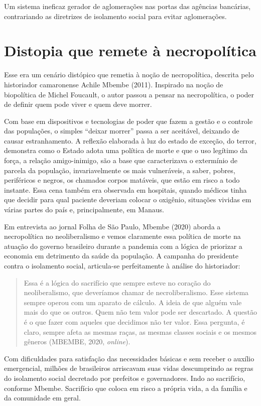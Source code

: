 Um sistema ineficaz gerador de aglomerações nas portas das agências
bancárias, contrariando as diretrizes de isolamento social para evitar
aglomerações.

\section{Distopia que remete à necropolítica}

Esse era um cenário distópico que remetia à noção de necropolítica,
descrita pelo historiador camaronense Achile Mbembe (2011). Inspirado na
noção de biopolítica de Michel Foucault, o autor passou a pensar na
necropolítica, o poder de definir quem pode viver e quem deve morrer.

Com base em dispositivos e tecnologias de poder que fazem a gestão e o
controle das populações, o simples ``deixar morrer'' passa a ser
aceitável, deixando de causar estranhamento. A reflexão elaborada à luz
do estado de exceção, do terror, demonstra como o Estado adota uma
política de morte e que o uso legítimo da força, a relação
amigo-inimigo, são a base que caracterizava o extermínio de parcela da
população, invariavelmente os mais vulneráveis, a saber, pobres,
periféricos e negros, os chamados corpos matáveis, que estão em risco a
todo instante. Essa cena também era observada em hospitais, quando
médicos tinha que decidir para qual paciente deveriam colocar o
oxigênio, situações vividas em várias partes do país e, principalmente,
em Manaus.

Em entrevista ao jornal Folha de São Paulo, Mbembe (2020) aborda a
necropolítica no neoliberalismo e vemos claramente essa política de
morte na atuação do governo brasileiro durante a pandemia com a lógica
de priorizar a economia em detrimento da saúde da população. A campanha
do presidente contra o isolamento social, articula-se perfeitamente à
análise do historiador:

\begin{quote}
Essa é a lógica do sacrifício que sempre esteve no coração do
neoliberalismo, que deveríamos chamar de necroliberalismo. Esse sistema
sempre operou com um aparato de cálculo. A ideia de que alguém vale mais
do que os outros. Quem não tem valor pode ser descartado. A questão é o
que fazer com aqueles que decidimos não ter valor. Essa pergunta, é
claro, sempre afeta as mesmas raças, as mesmas classes sociais e os
mesmos gêneros (MBEMBE, 2020, \textit{online}).
\end{quote}

Com dificuldades para satisfação das necessidades básicas e sem receber
o auxílio emergencial, milhões de brasileiros arriscavam suas vidas
descumprindo as regras do isolamento social decretado por prefeitos e
governadores. Indo ao sacrifício, conforme Mbembe. Sacrifício que coloca
em risco a própria vida, a da família e da comunidade em geral.

